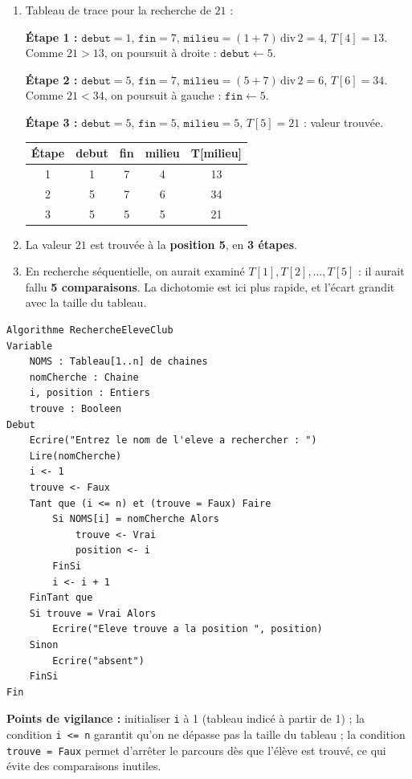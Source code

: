 \documentclass[11pt]{article}
\begin{document}
\begin{corrige}
\begin{enumerate}
\item Tableau de trace pour la recherche de $21$ :

\textbf{Étape 1 :} $\texttt{debut} = 1$, $\texttt{fin} = 7$, $\texttt{milieu} = (1+7)\,\text{div}\,2 = 4$, $T[4] = 13$. Comme $21 > 13$, on poursuit à droite : $\texttt{debut} \leftarrow 5$.

\textbf{Étape 2 :} $\texttt{debut} = 5$, $\texttt{fin} = 7$, $\texttt{milieu} = (5+7)\,\text{div}\,2 = 6$, $T[6] = 34$. Comme $21 < 34$, on poursuit à gauche : $\texttt{fin} \leftarrow 5$.

\textbf{Étape 3 :} $\texttt{debut} = 5$, $\texttt{fin} = 5$, $\texttt{milieu} = 5$, $T[5] = 21$ : valeur trouvée.

\begin{center}
\begin{tabular}{|c|c|c|c|c|}
\hline
\rowcolor{popblueL} Étape & debut & fin & milieu & T[milieu] \\
\hline
1 & 1 & 7 & 4 & 13 \\
\hline
2 & 5 & 7 & 6 & 34 \\
\hline
3 & 5 & 5 & 5 & 21 \\
\hline
\end{tabular}
\end{center}

\item La valeur $21$ est trouvée à la \textbf{position 5}, en \textbf{3 étapes}.
\item En recherche séquentielle, on aurait examiné $T[1], T[2], \ldots, T[5]$ : il aurait fallu \textbf{5 comparaisons}. La dichotomie est ici plus rapide, et l'écart grandit avec la taille du tableau.
\end{enumerate}
\end{corrige}

\begin{corrige}
\begin{lstlisting}
Algorithme RechercheEleveClub
Variable
    NOMS : Tableau[1..n] de chaines
    nomCherche : Chaine
    i, position : Entiers
    trouve : Booleen
Debut
    Ecrire("Entrez le nom de l'eleve a rechercher : ")
    Lire(nomCherche)
    i <- 1
    trouve <- Faux
    Tant que (i <= n) et (trouve = Faux) Faire
        Si NOMS[i] = nomCherche Alors
            trouve <- Vrai
            position <- i
        FinSi
        i <- i + 1
    FinTant que
    Si trouve = Vrai Alors
        Ecrire("Eleve trouve a la position ", position)
    Sinon
        Ecrire("absent")
    FinSi
Fin
\end{lstlisting}
\textbf{Points de vigilance :} initialiser \texttt{i} à 1 (tableau indicé à partir de 1) ; la condition \texttt{i <= n} garantit qu'on ne dépasse pas la taille du tableau ; la condition \texttt{trouve = Faux} permet d'arrêter le parcours dès que l'élève est trouvé, ce qui évite des comparaisons inutiles.
\end{corrige}
\end{document}

